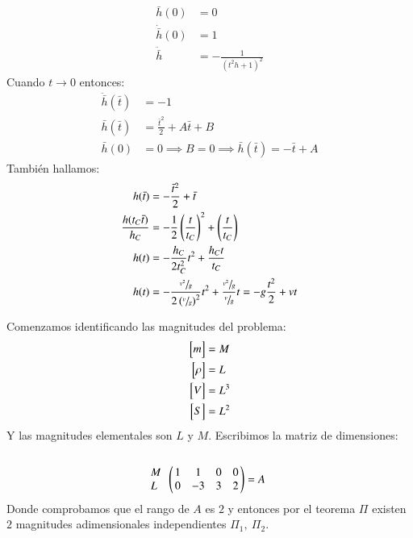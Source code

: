 \begin{ex}[H1.4]
\begin{enumerate}[a)]
\begin{enumerate}[(1)]
\begin{align*}
                \bar h (0) &= 0\\
                \dot{\bar h} (0) &= 1\\
                \ddot{\bar h} &= -\frac{1}{(t^2h+1)^2}
            \end{align*}
            Cuando $t \to 0$ entonces:
            \begin{align*}
                \ddot{\bar h }(\bar t) &= -1\\
                \bar h(\bar t) &= \frac{\bar t^2}{2}+A\bar t + B\\
                \bar h (0) &= 0 \implies B = 0 \implies \bar h (\bar t) = -\bar t + A
            \end{align*}
            También hallamos:
            \begin{align*}
                h(\bar t) &= - \frac{\bar t^2}{2} + \bar t\\
                \frac{h(t_C \bar t)}{h_C} &= -\frac{1}{2}\left(\frac{t}{t_C}\right)^2 + \left(\frac{t}{t_C}\right)\\
                h(t) &= - \frac{h_C}{2t_C^2}t^2 + \frac{h_Ct}{t_C}\\
                h(t) &= - \frac{\sfrac{v^2}{g}}{2 \left( \sfrac{v}{g} \right)^2}t^2 + \frac{\sfrac{v^2}{g}}{\sfrac{v}{g}}t = -g\frac{t^2}{2} + vt
            \end{align*}
        \end{enumerate}
    \end{enumerate}
\end{ex}

\begin{ex}[H1.1]
    Comenzamos identificando las magnitudes del problema:
    \begin{align*}
        \mx{m} &= M\\
        \mx{\rho} &= L\\
        \mx{V} &= L^3\\
        \mx{S} &= L^2
    \end{align*}
    Y las magnitudes elementales son $L$ y $M$. Escribimos la matriz de dimensiones:
    $$
    \Dmx{
        ~ & & & & \cr
        M & 1 & 1 & 0 & 0\cr
        L & 0 & -3 & 3 & 2
        } = A
    $$
    Donde comprobamos que el rango de $A$ es $2$ y entonces por el teorema $\Pi$ existen $2$ magnitudes adimensionales independientes $\Pi_1,\ \Pi_2$.
\end{ex}
